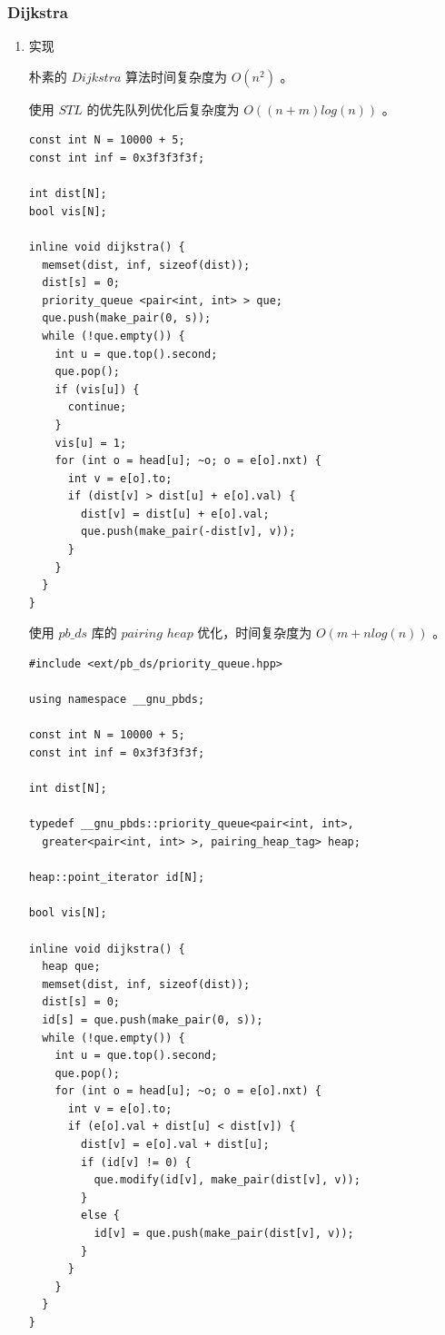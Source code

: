 \documentclass[11pt]{article}
\begin{document}
\subsubsection{Dijkstra}
\label{sec-6-6-1}
\begin{enumerate}
\item 实现
\label{sec-6-6-1-1}

朴素的 $Dijkstra$ 算法时间复杂度为 $O(n^2)$ 。

使用 $STL$ 的优先队列优化后复杂度为 $O((n+m)log(n))$ 。

\begin{verbatim}
const int N = 10000 + 5;
const int inf = 0x3f3f3f3f;

int dist[N];
bool vis[N];

inline void dijkstra() {
  memset(dist, inf, sizeof(dist));
  dist[s] = 0;
  priority_queue <pair<int, int> > que;
  que.push(make_pair(0, s));
  while (!que.empty()) {
    int u = que.top().second;
    que.pop();
    if (vis[u]) {
      continue;
    }
    vis[u] = 1;
    for (int o = head[u]; ~o; o = e[o].nxt) {
      int v = e[o].to;
      if (dist[v] > dist[u] + e[o].val) {
        dist[v] = dist[u] + e[o].val;
        que.push(make_pair(-dist[v], v));
      }
    }
  }
}
\end{verbatim}


使用 $pb\_ds$ 库的 $pairing$   $heap$ 优化，时间复杂度为 $O(m+nlog(n))$ 。

\begin{verbatim}
#include <ext/pb_ds/priority_queue.hpp>

using namespace __gnu_pbds;

const int N = 10000 + 5;
const int inf = 0x3f3f3f3f;

int dist[N];

typedef __gnu_pbds::priority_queue<pair<int, int>, 
  greater<pair<int, int> >, pairing_heap_tag> heap;

heap::point_iterator id[N];

bool vis[N];

inline void dijkstra() {
  heap que;
  memset(dist, inf, sizeof(dist));
  dist[s] = 0;
  id[s] = que.push(make_pair(0, s));
  while (!que.empty()) {
    int u = que.top().second;
    que.pop();
    for (int o = head[u]; ~o; o = e[o].nxt) {
      int v = e[o].to;
      if (e[o].val + dist[u] < dist[v]) {
        dist[v] = e[o].val + dist[u];
        if (id[v] != 0) {
          que.modify(id[v], make_pair(dist[v], v));
        }
        else {
          id[v] = que.push(make_pair(dist[v], v));
        }
      }
    }
  }
}
\end{verbatim}
\end{enumerate}
\end{document}
